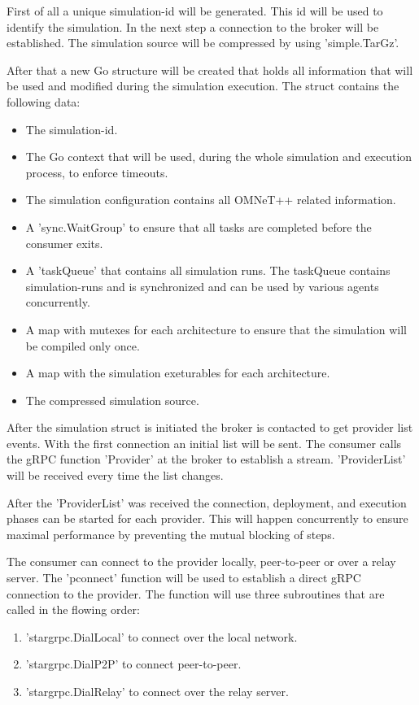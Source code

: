 First of all a unique simulation-id will be generated. This id will be used to identify the simulation. In the next step a connection to the broker will be established. The simulation source will be compressed by using 'simple.TarGz'.

After that a new Go structure will be created that holds all information that will be used and modified during the simulation execution. The struct contains the following data:
\begin{itemize}
    \item The simulation-id.
    \item The Go context that will be used, during the whole simulation and execution process, to enforce timeouts.
    \item The simulation configuration contains all OMNeT++ related information.
    \item A 'sync.WaitGroup' to ensure that all tasks are completed before the consumer exits.
    \item A 'taskQueue' that contains all simulation runs. The taskQueue contains simulation-runs and is synchronized and can be used by various agents concurrently.
    \item A map with mutexes for each architecture to ensure that the simulation will be compiled only once.
    \item A map with the simulation exeturables for each architecture.
    \item The compressed simulation source.
\end{itemize}

After the simulation struct is initiated the broker is contacted to get provider list events. With the first connection an initial list will be sent. The consumer calls the gRPC function 'Provider' at the broker to establish a stream. 'ProviderList' will be received every time the list changes.

After the 'ProviderList' was received the connection, deployment, and execution phases can be started for each provider. This will happen concurrently to ensure maximal performance by preventing the mutual blocking of steps.

The consumer can connect to the provider locally, peer-to-peer or over a relay server. The 'pconnect' function will be used to establish a direct gRPC connection to the provider. The function will use three subroutines that are called in the flowing order:
\begin{enumerate}
    \item 'stargrpc.DialLocal' to connect over the local network.
    \item 'stargrpc.DialP2P' to connect peer-to-peer.
    \item 'stargrpc.DialRelay' to connect over the relay server.
\end{enumerate}

